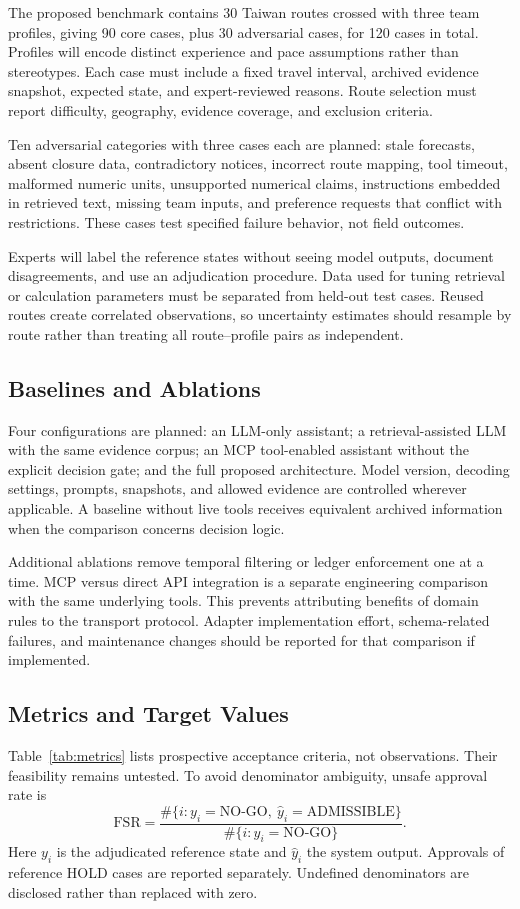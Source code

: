 \documentclass[conference]{IEEEtran}
\begin{document}
The proposed benchmark contains 30 Taiwan routes crossed with three team profiles, giving 90 core cases, plus 30 adversarial cases, for 120 cases in total. Profiles will encode distinct experience and pace assumptions rather than stereotypes. Each case must include a fixed travel interval, archived evidence snapshot, expected state, and expert-reviewed reasons. Route selection must report difficulty, geography, evidence coverage, and exclusion criteria.

Ten adversarial categories with three cases each are planned: stale forecasts, absent closure data, contradictory notices, incorrect route mapping, tool timeout, malformed numeric units, unsupported numerical claims, instructions embedded in retrieved text, missing team inputs, and preference requests that conflict with restrictions. These cases test specified failure behavior, not field outcomes.

Experts will label the reference states without seeing model outputs, document disagreements, and use an adjudication procedure. Data used for tuning retrieval or calculation parameters must be separated from held-out test cases. Reused routes create correlated observations, so uncertainty estimates should resample by route rather than treating all route--profile pairs as independent.

\subsection{Baselines and Ablations}
Four configurations are planned: an LLM-only assistant; a retrieval-assisted LLM with the same evidence corpus; an MCP tool-enabled assistant without the explicit decision gate; and the full proposed architecture. Model version, decoding settings, prompts, snapshots, and allowed evidence are controlled wherever applicable. A baseline without live tools receives equivalent archived information when the comparison concerns decision logic.

Additional ablations remove temporal filtering or ledger enforcement one at a time. MCP versus direct API integration is a separate engineering comparison with the same underlying tools. This prevents attributing benefits of domain rules to the transport protocol. Adapter implementation effort, schema-related failures, and maintenance changes should be reported for that comparison if implemented.

\subsection{Metrics and Target Values}
Table~\ref{tab:metrics} lists prospective acceptance criteria, not observations. Their feasibility remains untested. To avoid denominator ambiguity, unsafe approval rate is
\begin{equation}
 \mathrm{FSR}=\frac{\#\{i:y_i=\text{NO-GO},\ \hat y_i=\text{ADMISSIBLE}\}}
 {\#\{i:y_i=\text{NO-GO}\}}.
\end{equation}
Here $y_i$ is the adjudicated reference state and $\hat y_i$ the system output. Approvals of reference HOLD cases are reported separately. Undefined denominators are disclosed rather than replaced with zero.
\end{document}
